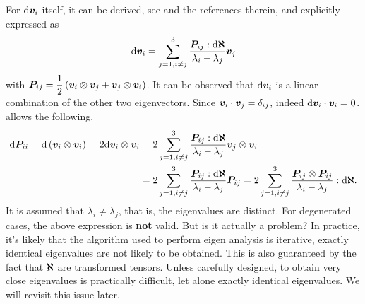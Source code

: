 For $\mathrm{d}\bm{v}_i$ itself, it can be derived, see \cite{Wu2006} and the references therein, and explicitly expressed as
\begin{gather}\label{eq:eigenvector_diff_def}
    \mathrm{d}\bm{v}_i=\sum_{j=1,i\neq{}j}^3\dfrac{\bm{P}_{ij}:\mathrm{d}\bm{\aleph}}{\lambda_i-\lambda_j}\bm{v}_j
\end{gather}
with $\bm{P}_{ij}=\dfrac{1}{2}\left(\bm{v}_i\otimes\bm{v}_j+\bm{v}_j\otimes\bm{v}_i\right)$.
It can be observed that $ \mathrm{d}\bm{v}_i$ is a linear combination of the other two eigenvectors.
Since $\bm{v}_i\cdot\bm{v}_j=\delta_{ij}$, indeed $\mathrm{d}\bm{v}_i\cdot\bm{v}_i=0$.
 allows the following.
\begin{gather}
    \begin{split}
        \mathrm{d}\bm{P}_{ii}=\mathrm{d}\left(\bm{v}_i\otimes\bm{v}_i\right)=2\mathrm{d}\bm{v}_i\otimes\bm{v}_i & =2\sum_{j=1,i\neq{}j}^3\dfrac{\bm{P}_{ij}:\mathrm{d}\bm{\aleph}}{\lambda_i-\lambda_j}\bm{v}_j\otimes\bm{v}_i \\&=2\sum_{j=1,i\neq{}j}^3\dfrac{\bm{P}_{ij}:\mathrm{d}\bm{\aleph}}{\lambda_i-\lambda_j}\bm{P}_{ij}=2\sum_{j=1,i\neq{}j}^3\dfrac{\bm{P}_{ij}\otimes\bm{P}_{ij}}{\lambda_i-\lambda_j}:\mathrm{d}\bm{\aleph}.
    \end{split}
\end{gather}
It is assumed that $\lambda_i\neq\lambda_j$, that is, the eigenvalues are distinct.
For degenerated cases, the above expression is \textbf{not} valid.
But is it actually a problem?
In practice, it's likely that the algorithm used to perform eigen analysis is iterative, exactly identical eigenvalues are not likely to be obtained.
This is also guaranteed by the fact that $\bm{\aleph}$ are transformed tensors.
Unless carefully designed, to obtain very close eigenvalues is practically difficult, let alone exactly identical eigenvalues.
We will revisit this issue later.

